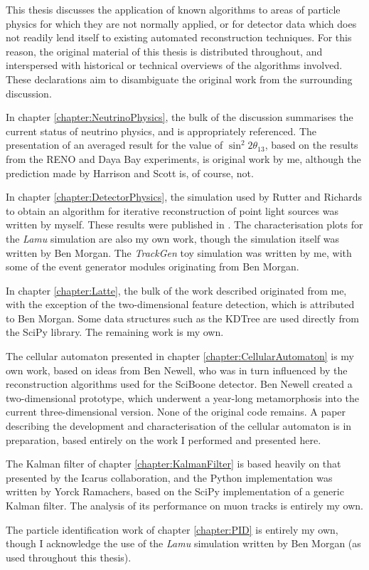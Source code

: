 This thesis discusses the application of known algorithms to areas of particle physics for which they are not normally applied, or for detector data which does not readily lend itself to existing automated reconstruction techniques. For this reason, the original material of this thesis is distributed throughout, and interspersed with historical or technical overviews of the algorithms involved. These declarations aim to disambiguate the original work from the surrounding discussion.

In chapter \ref{chapter:NeutrinoPhysics}, the bulk of the discussion summarises the current status of neutrino physics, and is appropriately referenced. The presentation of an averaged result for the value of $\sin^2 2\theta_{13}$, based on the results from the RENO and Daya Bay experiments, is original work by me, although the prediction made by Harrison and Scott is, of course, not.

In chapter \ref{chapter:DetectorPhysics}, the simulation used by Rutter and Richards to obtain an algorithm for iterative reconstruction of point light sources was written by myself. These results were published in \citep{Rutter2011}. The characterisation plots for the \emph{Lamu} simulation are also my own work, though the simulation itself was written by Ben Morgan. The \emph{TrackGen} toy simulation was written by me, with some of the event generator modules originating from Ben Morgan.

In chapter \ref{chapter:Latte}, the bulk of the work described originated from me, with the exception of the two-dimensional feature detection, which is attributed to Ben Morgan. Some data structures such as the KDTree are used directly from the SciPy library. The remaining work is my own.

The cellular automaton presented in chapter \ref{chapter:CellularAutomaton} is my own work, based on ideas from Ben Newell, who was in turn influenced by the reconstruction algorithms used for the SciBoone detector. Ben Newell created a two-dimensional prototype, which underwent a year-long metamorphosis into the current three-dimensional version. None of the original code remains. A paper describing the development and characterisation of the cellular automaton is in preparation, based entirely on the work I performed and presented here.

The Kalman filter of chapter \ref{chapter:KalmanFilter} is based heavily on that presented by the Icarus collaboration, and the Python implementation was written by Yorck Ramachers, based on the SciPy implementation of a generic Kalman filter. The analysis of its performance on muon tracks is entirely my own.

The particle identification work of chapter \ref{chapter:PID} is entirely my own, though I acknowledge the use of the \emph{Lamu} simulation written by Ben Morgan (as used throughout this thesis).
